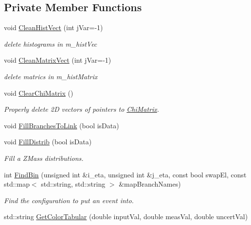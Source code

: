 \subsection*{Private Member Functions}
\begin{DoxyCompactItemize}
\item 
void \hyperlink{classTemplateMethod_1_1Template_ad496f3489040f18458379196eed57dca}{Clean\+Hist\+Vect} (int j\+Var=-\/1)
\begin{DoxyCompactList}\small\item\em delete histograms in m\+\_\+hist\+Vec \end{DoxyCompactList}\item 
void \hyperlink{classTemplateMethod_1_1Template_a27356fcc65e7ab756d6011ada45a1f1e}{Clean\+Matrix\+Vect} (int j\+Var=-\/1)
\begin{DoxyCompactList}\small\item\em delete matrics in m\+\_\+hist\+Matrix \end{DoxyCompactList}\item 
void \hyperlink{classTemplateMethod_1_1Template_a8efa448d8eb5c167169424183f0f73d9}{Clear\+Chi\+Matrix} ()
\begin{DoxyCompactList}\small\item\em Properly delete 2\+D vectors of pointers to \hyperlink{classTemplateMethod_1_1ChiMatrix}{Chi\+Matrix}. \end{DoxyCompactList}\item 
void \hyperlink{classTemplateMethod_1_1Template_aab337b637859c9c6bc39aab8f09de5ce}{Fill\+Branches\+To\+Link} (bool is\+Data)
\item 
void \hyperlink{classTemplateMethod_1_1Template_a42951772d8ea2d27f27b51aec918bf35}{Fill\+Distrib} (bool is\+Data)
\begin{DoxyCompactList}\small\item\em Fill a Z\+Mass distributions. \end{DoxyCompactList}\item 
int \hyperlink{classTemplateMethod_1_1Template_abb91781377dfbb3de1af106d6f9c58d0}{Find\+Bin} (unsigned int \&i\+\_\+eta, unsigned int \&j\+\_\+eta, const bool swap\+El, const std\+::map$<$ std\+::string, std\+::string $>$ \&map\+Branch\+Names)
\begin{DoxyCompactList}\small\item\em Find the configuration to put an event into. \end{DoxyCompactList}\item 
std\+::string \hyperlink{classTemplateMethod_1_1Template_af6680348579cf6ee159cd03da7bb0506}{Get\+Color\+Tabular} (double input\+Val, double meas\+Val, double uncert\+Val)

\end{DoxyCompactItemize}
